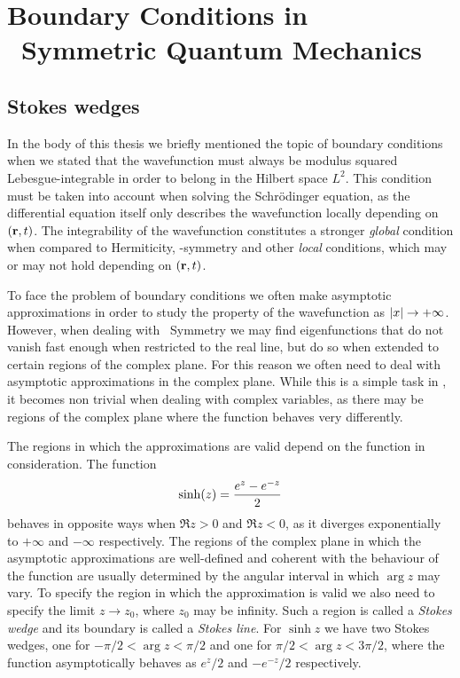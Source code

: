 \chapter[Boundary Conditions in \PT\ Symmetric Quantum Mechanics][Boundary Conditions]{Boundary Conditions in \PT\ Symmetric Quantum Mechanics}\label{a:stokes}
    \section*{Stokes wedges}
        In the body of this thesis we briefly mentioned the topic of boundary conditions when we stated that the wavefunction must always be modulus squared Lebesgue-integrable in order to belong in the Hilbert space $L^2$. This condition must be taken into account when solving the Schr\"odinger equation, as the differential equation itself only describes the wavefunction locally depending on $\pqty{\vb{r},t}$. The integrability of the wavefunction constitutes a stronger \emph{global} condition when compared to Hermiticity, \PT-symmetry and other \emph{local} conditions, which may or may not hold depending on $\pqty{\vb{r},t}$.

        To face the problem of boundary conditions we often make asymptotic approximations in order to study the property of the wavefunction as $\abs{x}\to+\infty$. However, when dealing with \PT\ Symmetry we may find eigenfunctions that do not vanish fast enough when restricted to the real line, but do so when extended to certain regions of the complex plane. For this reason we often need to deal with asymptotic approximations in the complex plane. While this is a simple task in \bbR, it becomes non trivial when dealing with complex variables, as there may be regions of the complex plane where the function behaves very differently.

        The regions in which the approximations are valid depend on the function in consideration. The function
        \begin{align*}
            \sinh\!\pqty{z} = \frac{e^z - e^{-z}}{2}
        \end{align*}
        behaves in opposite ways when $\Re z > 0$ and $\Re z < 0$, as it diverges exponentially to $+\infty$ and $-\infty$ respectively. The regions of the complex plane in which the asymptotic approximations are well-defined and coherent with the behaviour of the function are usually determined by the angular interval in which $\arg z$ may vary. To specify the region in which the approximation is valid we also need to specify the limit $z \to z_0$, where $z_0$ may be infinity. Such a region is called a \emph{Stokes wedge} and its boundary is called a \emph{Stokes line}. For $\sinh z$ we have two Stokes wedges, one for $-\pi/2 < \arg z < \pi/2$ and one for $\pi/2 < \arg z < 3\pi/2$, where the function asymptotically behaves as $e^z/2$ and $-e^{-z}/2$ respectively. 

